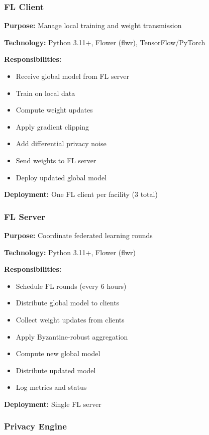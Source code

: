 \documentclass[12pt,a4paper]{article}
\begin{document}
\subsubsection{FL Client}

\textbf{Purpose:} Manage local training and weight transmission

\textbf{Technology:} Python 3.11+, Flower (flwr), TensorFlow/PyTorch

\textbf{Responsibilities:}
\begin{itemize}[leftmargin=1cm,itemsep=0pt]
    \item Receive global model from FL server
    \item Train on local data
    \item Compute weight updates
    \item Apply gradient clipping
    \item Add differential privacy noise
    \item Send weights to FL server
    \item Deploy updated global model
\end{itemize}

\textbf{Deployment:} One FL client per facility (3 total)

\subsubsection{FL Server}

\textbf{Purpose:} Coordinate federated learning rounds

\textbf{Technology:} Python 3.11+, Flower (flwr)

\textbf{Responsibilities:}
\begin{itemize}[leftmargin=1cm,itemsep=0pt]
    \item Schedule FL rounds (every 6 hours)
    \item Distribute global model to clients
    \item Collect weight updates from clients
    \item Apply Byzantine-robust aggregation
    \item Compute new global model
    \item Distribute updated model
    \item Log metrics and status
\end{itemize}

\textbf{Deployment:} Single FL server

\subsubsection{Privacy Engine}
\end{document}
